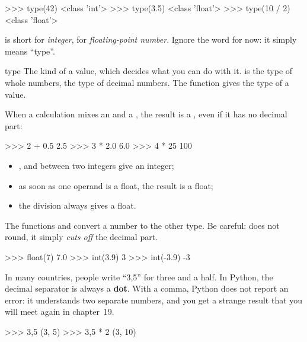 \begin{console}
>>> type(42)
<class 'int'>
>>> type(3.5)
<class 'float'>
>>> type(10 / 2)
<class 'float'>
\end{console}

 is short for \emph{integer},  for \emph{floating-point number}. Ignore the word
 for now: it simply means \enquote{type}.

\begin{definition}{type}
The kind of a value, which decides what you can do with it.  is the type of whole numbers,
 the type of decimal numbers. The function  gives the type of a value.
\end{definition}

When a calculation mixes an  and a , the result is a , even if it has no
decimal part:

\begin{console}
>>> 2 + 0.5
2.5
>>> 3 * 2.0
6.0
>>> 4 * 25
100
\end{console}

\begin{regle}
\begin{itemize}
\item \py{+}, \py{-} and \py{*} between two integers give an integer;
\item as soon as one operand is a float, the result is a float;
\item the division \py{/} always gives a float.
\end{itemize}
\end{regle}

The functions  and  convert a number to the other type. Be careful:
 does not round, it simply \emph{cuts off} the decimal part.

\begin{console}
>>> float(7)
7.0
>>> int(3.9)
3
>>> int(-3.9)
-3
\end{console}

\begin{attention}
In many countries, people write \enquote{3,5} for three and a half. In Python, the decimal separator
is always a \textbf{dot}. With a comma, Python does not report an error: it understands two separate
numbers, and you get a strange result that you will meet again in chapter~19.
\begin{console}
>>> 3,5
(3, 5)
>>> 3,5 * 2
(3, 10)
\end{console}
\end{attention}

